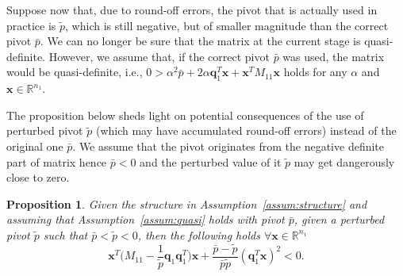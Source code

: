 \documentclass[a4paper]{article}
\newcommand{\qvec}{\mathbf q}
\newcommand{\xvec}{\mathbf x}
\newcommand{\0}{\mathbf 0}
\newtheorem{proposition}{Proposition}
\begin{document}
Suppose now that, due to round-off errors, the pivot that is actually used in practice is $\tilde p$, which is still negative, but of smaller magnitude than the correct pivot $\bar p$. We can no longer be sure that the matrix at the current stage is quasi-definite. However, we assume that, if the correct pivot $\bar p$ was used, the matrix would be quasi-definite, i.e., $0>\alpha^2\bar p+2\alpha \qvec_1^T\xvec +\xvec^TM_{11}\xvec$ holds for any $\alpha$ and $\xvec\in\mathbb R^{n_1}$.

The proposition below sheds light on potential consequences of the use of perturbed pivot $\tilde p$ (which may have 
accumulated round-off errors) instead of the original one $\bar p$. We assume that the pivot originates from the negative definite part of matrix hence $\bar p < 0$ and the perturbed value of it $\tilde p$ may get dangerously close to zero.

\begin{proposition}
Given the structure in Assumption~\ref{assum:structure} and assuming that Assumption~\ref{assum:quasi} holds with pivot $\bar p$, given a perturbed pivot $\tilde p$ such that $\bar p<\tilde p<0$, then the following holds $\forall\xvec\in\mathbb R^{n_1}$
\[\xvec^T\Big(M_{11}-\frac{1}{\tilde p}\qvec_1\qvec_1^T\Big)\xvec
+\frac{\bar p-\tilde p}{\bar p\tilde p}(\qvec_1^T\xvec)^2 < 0.\]
\end{proposition}
\end{document}
